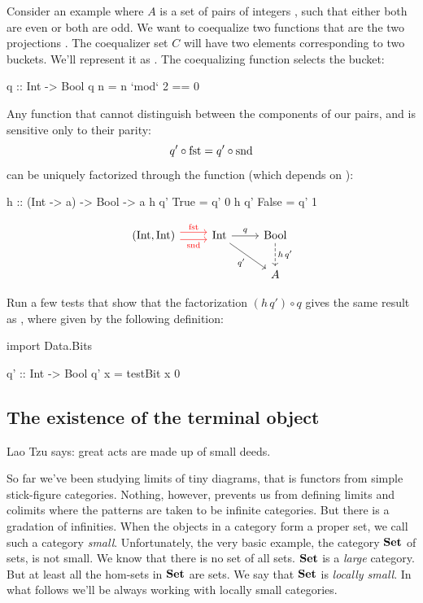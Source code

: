 \documentclass[DaoFP]{subfiles}
\begin{document}
Consider an example where $A$ is a set of pairs of integers , such that either both are even or both are odd.  We want to coequalize two functions that are the two projections . The coequalizer set $C$ will have two elements corresponding to two buckets. We'll represent it as . The coequalizing function  selects the bucket:
\begin{haskell}
q :: Int -> Bool
q n = n `mod` 2 == 0 
\end{haskell}
Any function  that cannot distinguish between the components of our pairs, and is sensitive only to their parity:
\[ q' \circ \mathop{\text{fst}} = q' \circ \mathop{\text{snd}} \]
 can be uniquely factorized through the function  (which depends on ):
\begin{haskell}
h :: (Int -> a) -> Bool -> a
h q' True  = q' 0
h q' False = q' 1
\end{haskell}

\[
\begin{tikzcd}
(\text{Int}, \text{Int})
\arrow[r, red, shift left=.75ex, "\text{fst}"]
\arrow[r, red, shift right=.75ex, "\text{snd}"']
&
\text{Int}
\arrow[r, "q"]
\arrow[rd, "q'"']
& \text{Bool}
\arrow[d, dashed, "h \, q'"]
\\
&& A
\end{tikzcd}
\]

\begin{exercise}
Run a few tests that show that the factorization $(h\, q') \circ q$ gives the same result as , where  given by the following definition:
\begin{haskell}
import Data.Bits

q' :: Int -> Bool
q' x = testBit x 0
\end{haskell}

\end{exercise}

\subsection{The existence of the terminal object}

Lao Tzu says: great acts are made up of small deeds.

So far we've been studying limits of tiny diagrams, that is functors from simple stick-figure categories. Nothing, however, prevents us from defining limits and colimits where the patterns are taken to be infinite categories. But there is a gradation of infinities. When the objects in a category form a proper set, we call such a category  \emph{small}. Unfortunately, the very basic example, the category $\mathbf{Set}$ of sets, is not small. We know that there is no set of all sets. $\mathbf{Set}$ is a \emph{large} category. But at least all the hom-sets in $\mathbf{Set}$ are sets. We say that $\mathbf{Set}$ is \emph{locally small}. In what follows we'll be always working with locally small categories.
\end{document}
